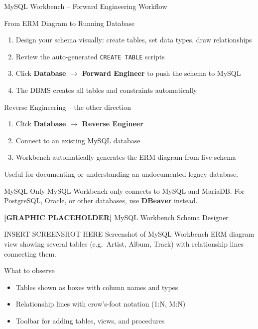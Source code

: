 \begin{frame}{MySQL Workbench -- Forward Engineering Workflow}
  \begin{block}{From ERM Diagram to Running Database}
    \begin{enumerate}
      \item Design your schema visually: create tables, set data types, draw relationships
      \item Review the auto-generated \texttt{CREATE TABLE} scripts
      \item Click \textbf{Database $\to$ Forward Engineer} to push the schema to MySQL
      \item The DBMS creates all tables and constraints automatically
    \end{enumerate}
  \end{block}

  \begin{block}{Reverse Engineering -- the other direction}
    \begin{enumerate}
      \item Click \textbf{Database $\to$ Reverse Engineer}
      \item Connect to an existing MySQL database
      \item Workbench automatically generates the ERM diagram from live schema
    \end{enumerate}
    Useful for documenting or understanding an undocumented legacy database.
  \end{block}

  \begin{alertblock}{MySQL Only}
    MySQL Workbench only connects to MySQL and MariaDB. For PostgreSQL, Oracle,
    or other databases, use \textbf{DBeaver} instead.
  \end{alertblock}
\end{frame}

\begin{frame}{\textbf{[GRAPHIC PLACEHOLDER]} MySQL Workbench Schema Designer}
  \begin{alertblock}{INSERT SCREENSHOT HERE}
    Screenshot of MySQL Workbench ERM diagram view showing several tables
    (e.g.\ Artist, Album, Track) with relationship lines connecting them.
  \end{alertblock}

  \begin{block}{What to observe}
    \begin{itemize}
      \item Tables shown as boxes with column names and types
      \item Relationship lines with crow's-foot notation (1:N, M:N)
      \item Toolbar for adding tables, views, and procedures
    \end{itemize}
  \end{block}
\end{frame}
